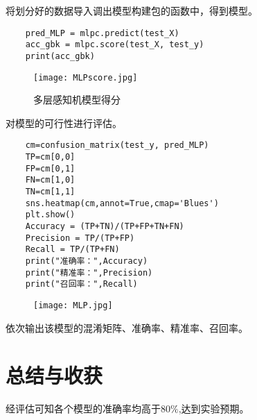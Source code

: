 \documentclass[AutoFakeBold]{LZUThesis}
\begin{document}
将划分好的数据导入调出模型构建包的函数中，得到模型。
\begin{lstlisting}
    pred_MLP = mlpc.predict(test_X)
    acc_gbk = mlpc.score(test_X, test_y)
    print(acc_gbk)
\end{lstlisting}
\begin{figure}[htbp]
    \centering
    \texttt{[image: MLPscore.jpg]}
    \caption{多层感知机模型得分}
\end{figure}
对模型的可行性进行评估。
\begin{lstlisting}
    cm=confusion_matrix(test_y, pred_MLP)
    TP=cm[0,0]
    FP=cm[0,1]
    FN=cm[1,0]
    TN=cm[1,1]
    sns.heatmap(cm,annot=True,cmap='Blues')
    plt.show()
    Accuracy = (TP+TN)/(TP+FP+TN+FN)
    Precision = TP/(TP+FP)
    Recall = TP/(TP+FN)
    print("准确率：",Accuracy)
    print("精准率：",Precision)
    print("召回率：",Recall)
\end{lstlisting}
\begin{figure}[htbp]
    \centering
    \texttt{[image: MLP.jpg]}
\end{figure}
依次输出该模型的混淆矩阵、准确率、精准率、召回率。
\chapter{总结与收获}
 
经评估可知各个模型的准确率均高于$80\%$,达到实验预期。
\backmatter


\printbib
\nocite{*} %




\end{document}
